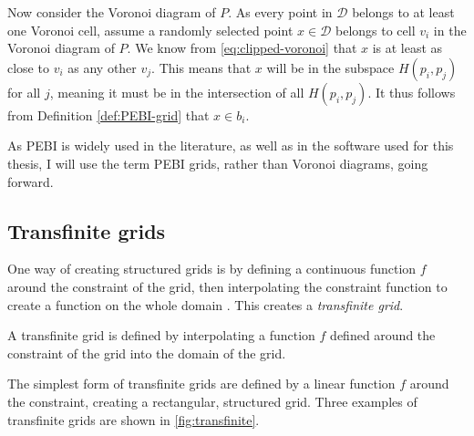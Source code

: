 Now consider the Voronoi diagram of $P$. As every point in $\mathcal{D}$ belongs to at least one Voronoi cell, assume a randomly selected point $x \in \mathcal{D}$ belongs to cell $v_i$ in the Voronoi diagram of $P$. We know from \autoref{eq:clipped-voronoi} that $x$ is at least as close to $v_i$ as any other $v_j$. This means that $x$ will be in the subspace $H(p_i, p_j)$ for all $j$, meaning it must be in the intersection of all $H(p_i, p_j)$. It thus follows from Definition \ref{def:PEBI-grid} that $x \in b_i$.

As PEBI is widely used in the literature, as well as in the software used for this thesis, I will use the term PEBI grids, rather than Voronoi diagrams, going forward.

\subsection{Transfinite grids}
One way of creating structured grids is by defining a continuous function $f$ around the constraint of the grid, then interpolating the constraint function to create a function on the whole domain \cite{transfinite}. This creates a \emph{transfinite grid}.
\begin{definition}
A transfinite grid is defined by interpolating a function $f$ defined around the constraint of the grid into the domain of the grid.
\end{definition}
The simplest form of transfinite grids are defined by a linear function $f$ around the constraint, creating a rectangular, structured grid. Three examples of transfinite grids are shown in \autoref{fig:transfinite}.

